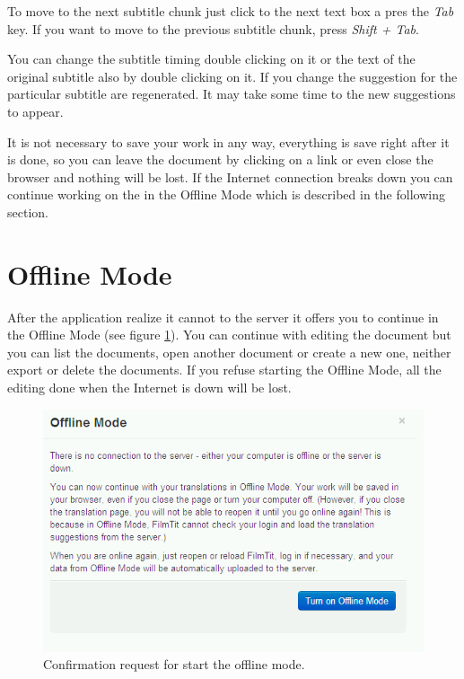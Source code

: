 To move to the next subtitle chunk just click to the next text box a pres the \emph{Tab} key. If you want to move to the previous subtitle chunk, press \emph{Shift + Tab}.

You can change the subtitle timing double clicking on it or the text of the original subtitle also by double clicking on it. If you change the suggestion for the particular subtitle are regenerated. It may take some time to the new suggestions to appear.

It is not necessary to save your work in any way, everything is save right after it is done, so you can leave the document by clicking on a link or even close the browser and nothing will be lost. If the Internet connection breaks down you can continue working on the in the Offline Mode which is described in the following section.

\section{Offline Mode}

After the application realize it cannot to the server it offers you to continue in the Offline Mode (see figure \ref{fig:start_offline_mode}). You can continue with editing the document but you can list the documents, open another document or create a new one, neither export or delete the documents. If you refuse starting the Offline Mode, all the editing done when the Internet is down will be lost.

\begin{figure}[h]
\begin{center}
\includegraphics[scale=0.4]{figures/user_manual/offline_mode.png}
\end{center}
\caption{Confirmation request for start the offline mode.}
\label{fig:start_offline_mode}
\end{figure}

